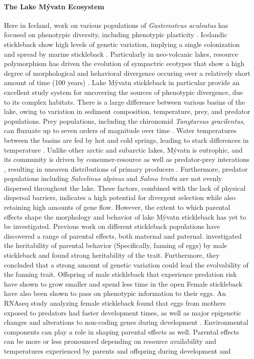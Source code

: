 \documentclass[12pt]{extarticle}
\begin{document}
\paragraph{The Lake M\'yvatn Ecosystem}
Here in Iceland, work on various populations of \textit{Gasterosteus aculeatus} has focused on phenotypic diversity, including phenotypic plasticity \citep{Kristjansson2002, Millet2013}. Icelandic stickleback show high levels of genetic variation, implying a single colonization and spread by marine stickleback \citep{Olafsdottir2007}. Particularly in neo-volcanic lakes, resource polymorphism has driven the evolution of sympactric ecotypes \citep{Olafsdottir2007, Kristjansson2002} that show a high degree of morphological and hehavioral divergence occuring over a relatively short amount of time (100 years) \citep{Lucek2014}. Lake M\'yvatn stickleback in particular provide an excellent study system for uncovering the sources of phenotypic divergence, due to its complex habitats. There is a large difference between various basins of the lake, owing to variation in sediment composition, temperature, prey, and predator populations. Prey populations, including the chironomid \textit{Tanytarsus gracilentus}, can fluxuate up to seven orders of magnitude over time \citep{Bartrons2018}.  Water temperatures between the basins are fed by hot and cold springs, leading to stark differences in temperature \citep{Einarsson2004}. Unlike other arctic and subarctic lakes, M\'yvatn is eutrophic, and its community is driven by consumer-resource as well as predator-prey interations \citep{Bartrons2018}, resulting in uneaven distributions of primary producers \citep{Einarsson2004}. Furthermore, predator populations including \textit{Salvelinus alpinus} and \textit{Salmo trutta} are not evenly dispersed throughout the lake. These factors, combined with the lack of physical dispersal barriers, indicates a high potential for divergent selection while also retaining high amounts of gene flow. However, the extent to which parental effects shape the morphology and behavior of lake M\'yvatn stickleback has yet to be investigated. Previous work on different stickleback populations have discovered a range of parental effects, both maternal and paternal. \citet{Bell2018} investigated the heritability of parental behavior (Specifically, fanning of eggs) by male stickleback and found strong heritability of the trait. Furthermore, they concluded that a strong amount of genetic variation could lead the evolvability of the fanning trait. Offspring of male stickleback that experience predation risk have shown to grow smaller and spend less time in the open \citep{Bell2016, Stein2014} Female stickleback have also been shown to pass on phenotypic information to their eggs. An RNAseq study analyzing female stickleback found that eggs from mothers exposed to predators had faster development times, as well as major epigenetic changes and alterations to non-coding genes during development \citep{Mommer2014, Bell2016}. Environmental components can play a role in shaping parental effects as well. Parental effects can be more or less pronounced depending on resource availability and temperatures experienced by parents and offspring during development \citep{Rasanen2007} and 
\end{document}
